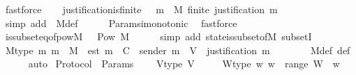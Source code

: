 \begin{isabellebody}
\ fastforce%
\endisatagproof
{\isafoldproof}%
%
\isadelimproof
\isanewline
%
\endisadelimproof
\isanewline
\ \ \isamarkupfalse%
\ justification{\isacharunderscore}is{\isacharunderscore}finite\ {\isacharcolon}\ {\isachardoublequoteopen}{\isasymforall}\ m\ {\isasymin}\ M{\isachardot}\ finite\ {\isacharparenleft}justification\ m{\isacharparenright}{\isachardoublequoteclose}\isanewline
%
\isadelimproof
\ \ \ \ %
\endisadelimproof
%
\isatagproof
{}\isamarkupfalse%
\ {\isacharparenleft}simp\ add{\isacharcolon}\ \ M{\isacharunderscore}def{\isacharparenright}\isanewline
\ \ \ \ \isamarkupfalse%
\ Params{\isachardot}{\isasymSigma}i{\isacharunderscore}monotonic\ \isamarkupfalse%
\ fastforce%
\endisatagproof
{\isafoldproof}%
%
\isadelimproof
\isanewline
%
\endisadelimproof
\isanewline
\ \ \isamarkupfalse%
\ {\isasymSigma}{\isacharunderscore}is{\isacharunderscore}subseteq{\isacharunderscore}of{\isacharunderscore}pow{\isacharunderscore}M{\isacharcolon}\ {\isachardoublequoteopen}{\isasymSigma}\ {\isasymsubseteq}\ Pow\ M{\isachardoublequoteclose}\isanewline
%
\isadelimproof
\ \ \ \ %
\endisadelimproof
%
\isatagproof
{}\isamarkupfalse%
\ {\isacharparenleft}simp\ add{\isacharcolon}\ state{\isacharunderscore}is{\isacharunderscore}subset{\isacharunderscore}of{\isacharunderscore}M\ subsetI{\isacharparenright}%
\endisatagproof
{\isafoldproof}%
%
\isadelimproof
\isanewline
%
\endisadelimproof
\isanewline
\ \ \isamarkupfalse%
\ M{\isacharunderscore}type{\isacharcolon}\ {\isachardoublequoteopen}{\isasymAnd}m{\isachardot}\ m\ {\isasymin}\ M\ {\isasymLongrightarrow}\ est\ m\ {\isasymin}\ C\ {\isasymand}\ sender\ m\ {\isasymin}\ V\ {\isasymand}\ justification\ m\ {\isasymin}\ {\isasymSigma}{\isachardoublequoteclose}\isanewline
%
\isadelimproof
\ \ \ \ %
\endisadelimproof
%
\isatagproof
{}\isamarkupfalse%
\ M{\isacharunderscore}def\ {\isasymSigma}{\isacharunderscore}def\isanewline
\ \ \ \ \isamarkupfalse%
\ auto%
\endisatagproof
{\isafoldproof}%
%
\isadelimproof
\isanewline
%
\endisadelimproof
\isanewline
{}\isamarkupfalse%
\isanewline
\isanewline
\isanewline
{}\isamarkupfalse%
\ Protocol\ {\isacharequal}\ Params\ {\isacharplus}\isanewline
\ \ \ V{\isacharunderscore}type{\isacharcolon}\ {\isachardoublequoteopen}V\ {\isasymnoteq}\ {\isasymemptyset}{\isachardoublequoteclose}\isanewline
\ \ \ W{\isacharunderscore}type{\isacharcolon}\ {\isachardoublequoteopen}{\isasymAnd}w{\isachardot}\ w\ {\isasymin}\ range\ W\ {\isasymLongrightarrow}\ w\ {\isachargreater}\ {}{\isachardoublequoteclose}\isanewline

\end{isabellebody}
